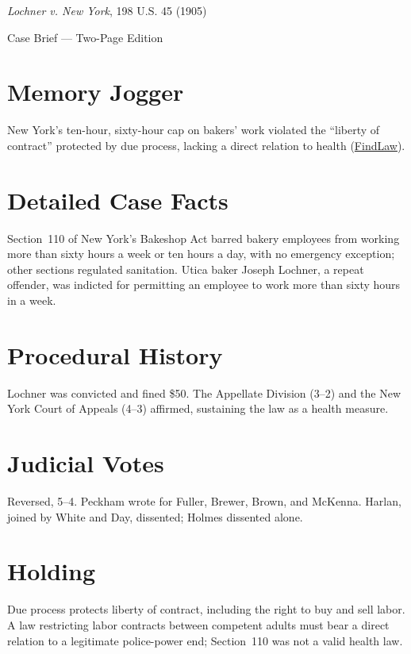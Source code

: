 \documentclass[12pt]{article}
\begin{document}
\begin{center}
{\LARGE \textit{Lochner v. New York}, 198 U.S. 45 (1905)\par}
\vspace{0.5em}
{\large Case Brief --- Two-Page Edition\par}
\end{center}

\section{Memory Jogger}
New York's ten-hour, sixty-hour cap on bakers' work violated the ``liberty of contract'' protected by due process, lacking a direct relation to health (\href{https://caselaw.findlaw.com/court/us-supreme-court/198/45.html}{FindLaw}).

\section{Detailed Case Facts}
Section~110 of New York's Bakeshop Act barred bakery employees from working more than sixty hours a week or ten hours a day, with no emergency exception; other sections regulated sanitation. Utica baker Joseph Lochner, a repeat offender, was indicted for permitting an employee to work more than sixty hours in a week.

\section{Procedural History}
Lochner was convicted and fined \$50. The Appellate Division (3--2) and the New York Court of Appeals (4--3) affirmed, sustaining the law as a health measure.

\section{Judicial Votes}
Reversed, 5--4. Peckham wrote for Fuller, Brewer, Brown, and McKenna. Harlan, joined by White and Day, dissented; Holmes dissented alone.

\section{Holding}
Due process protects liberty of contract, including the right to buy and sell labor. A law restricting labor contracts between competent adults must bear a direct relation to a legitimate police-power end; Section~110 was not a valid health law.
\end{document}
